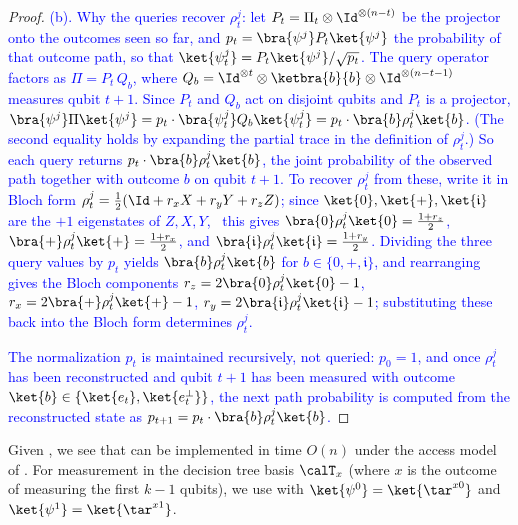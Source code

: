 \begin{proof}
\textcolor{blue}{(b). Why the queries recover $\rho^j_t$: 
let $P_t=\Pi_t\otimes\Id^{\otimes(n-t)}$ be the projector onto the outcomes seen so far, 
and $p_t=\bra{\smash{\psi^j}}P_t\ket{\smash{\psi^j}}$ the probability of that outcome path, 
so that $\ket{\smash{\psi^j_t}}=P_t\ket{\smash{\psi^j}}/\sqrt{p_t}$. 
The query operator factors as $\Pi=P_t\,Q_b$, 
where $Q_b=\Id^{\otimes t}\otimes\ketbra{b}{b}\otimes\Id^{\otimes(n-t-1)}$ measures qubit $t+1$. 
Since $P_t$ and $Q_b$ act on disjoint qubits and $P_t$ is a projector, 
$\bra{\smash{\psi^j}}\Pi\ket{\smash{\psi^j}}=p_t\cdot\bra{\smash{\psi^j_t}}Q_b\ket{\smash{\psi^j_t}} = p_t\cdot\bra{b}\rho^j_t\ket{b}$. 
(The second equality holds by expanding the partial trace in the definition of $\rho_t^j$.)
So each query returns $p_t\cdot\bra{b}\rho^j_t\ket{b}$, the joint probability of the observed path together with outcome $b$ on qubit $t+1$. 
To recover $\rho^j_t$ from these, write it in Bloch form $\rho^j_t=\tfrac12(\Id+r_xX+r_yY+r_zZ)$; since $\ket{0},\ket{+},\ket{\mathfrak{i}}$ are the $+1$ eigenstates of $Z,X,Y$, \
this gives $\bra{0}\rho^j_t\ket{0}=\tfrac{1+r_z}{2}$, $\bra{+}\rho^j_t\ket{+}=\tfrac{1+r_x}{2}$, and $\bra{\mathfrak{i}}\rho^j_t\ket{\mathfrak{i}}=\tfrac{1+r_y}{2}$. 
Dividing the three query values by $p_t$ yields $\bra{b}\rho^j_t\ket{b}$ for $b\in\{0,+,\mathfrak{i}\}$, 
and rearranging gives the Bloch components $r_z=2\bra{0}\rho^j_t\ket{0}-1$, $r_x=2\bra{+}\rho^j_t\ket{+}-1$, $r_y=2\bra{\mathfrak{i}}\rho^j_t\ket{\mathfrak{i}}-1$; 
substituting these back into the Bloch form determines $\rho^j_t$.}

\textcolor{blue}{The normalization $p_t$ is maintained recursively, not queried: $p_0=1$, and once $\rho^j_t$ has been reconstructed and qubit $t+1$ has been measured with outcome $\ket{b}\in\{\ket{e_t},\ket{\smash{e_t^\perp}}\}$, the next path probability is computed from the reconstructed state as $p_{t+1}=p_t\cdot\bra{b}\rho^j_t\ket{b}$.}
\end{proof}
Given , we see that  can be implemented in time $O(n)$ under the access model of . For measurement in the decision tree basis $\calT_x$ (where $x$ is the outcome of measuring the first $k-1$ qubits), we use  with $\ket{\psi^0}=\ket{\tar^{x0}}$ and $\ket{\psi^1}=\ket{\tar^{x1}}$.



